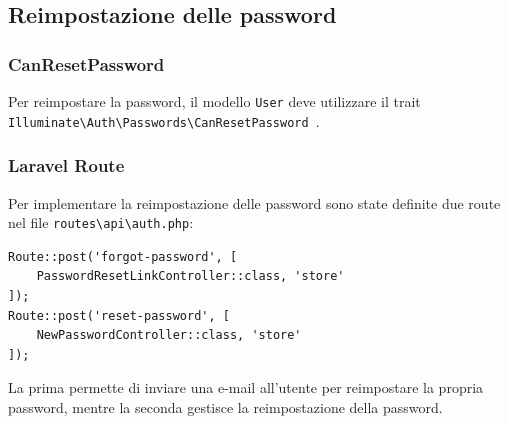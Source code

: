 \subsection{Reimpostazione delle password}
\subsubsection{CanResetPassword}
Per reimpostare la password, il modello \verb|User| deve utilizzare il trait \verb|Illuminate\Auth\Passwords\CanResetPassword|~\cite{LaravelResetPassword}.
\subsubsection{Laravel Route}
Per implementare la reimpostazione delle password sono state definite due route nel file \verb|routes\api\auth.php|:
\begin{lstlisting}[caption={Route per la reimpostazione delle password}, label={lst:route_registration}]
Route::post('forgot-password', [
	PasswordResetLinkController::class, 'store'
]);
Route::post('reset-password', [
	NewPasswordController::class, 'store'
]);
\end{lstlisting}

La prima permette di inviare una e-mail all'utente per reimpostare la propria password, mentre la seconda gestisce la reimpostazione della password.

